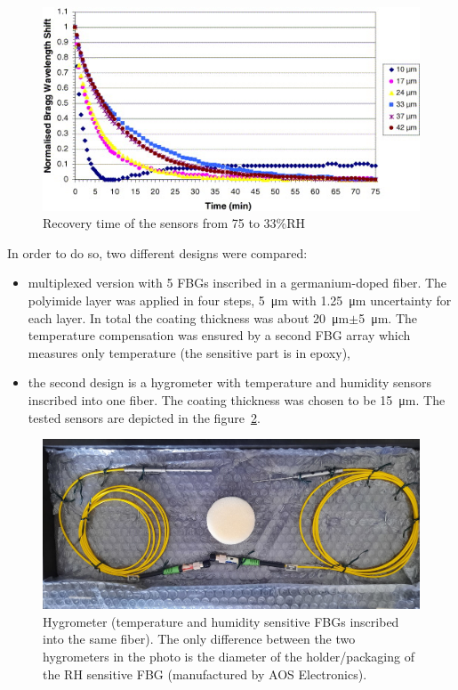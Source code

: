 \begin{figure}[!h]
\centering
\includegraphics[width=0.75\columnwidth]{Chapter5/images/time_response_yeo.jpg}
\caption{Recovery time of the sensors from 75 to 33\%RH~\cite{YEO_PI}}
\label{fig:yeo2}
\end{figure}

In order to do so, two different designs were compared:
\begin{itemize}
    \item multiplexed version with 5 \glspl{FBG} inscribed in a germanium-doped fiber. The polyimide layer was applied in four steps, \SI{5}{\micro\metre} with \SI{1.25}{\micro\metre} uncertainty for each layer. In total the coating thickness was about \SI{20}{\micro\metre}$\pm$\SI{5}{\micro\metre}. The temperature compensation was ensured by a second \gls{FBG} array which measures only temperature (the sensitive part is in epoxy),
    \item the second design is a hygrometer with temperature and humidity sensors inscribed into one fiber. The coating thickness was chosen to be \SI{15}{\micro\metre}. The tested sensors are depicted in the figure~\ref{fig_single_photo}.
\end{itemize}

\begin{figure}[!h]
\centering
\includegraphics[width=0.75\columnwidth]{Chapter5/images/single1.jpeg}
\caption{Hygrometer (temperature and humidity sensitive \glspl{FBG} inscribed into the same fiber). The only difference between the two hygrometers in the photo is the diameter of the holder/packaging of the \gls{RH} sensitive \gls{FBG} (manufactured by AOS Electronics).}
\label{fig_single_photo}
\end{figure}

